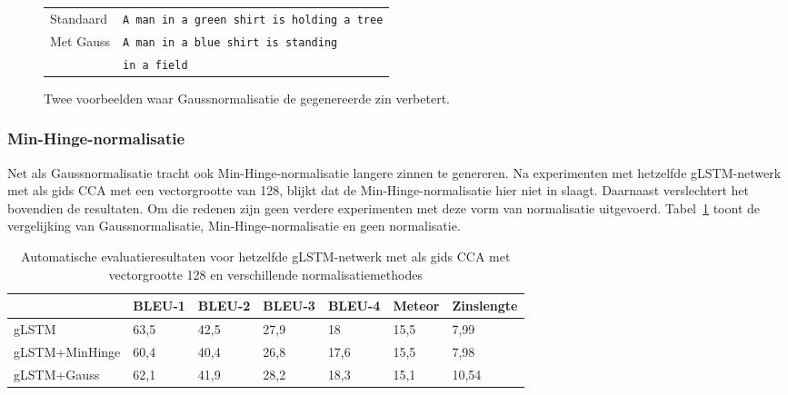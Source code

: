 \begin{figure}
\begin{minipage}[t]{.3\textwidth}
		\end{minipage}\hfill
		\begin{minipage}[t]{.7\textwidth}
			\vspace{0pt}
			\begin{tabular}{ll}
				Standaard & \texttt{A man in a green shirt is holding a tree} \\
				Met Gauss & \texttt{A man in a blue shirt is standing }\\
				~ & \texttt{in a field} \\
			\end{tabular}
		\end{minipage}
\caption{Twee voorbeelden waar Gaussnormalisatie de gegenereerde zin verbetert.}
\label{fig:gauss_improve}
\end{figure}
\subsubsection{Min-Hinge-normalisatie}
Net als Gaussnormalisatie tracht ook Min-Hinge-normalisatie langere zinnen te genereren.
Na experimenten met hetzelfde gLSTM-netwerk met als gids CCA met een vectorgrootte van 128, blijkt dat de Min-Hinge-normalisatie hier niet in slaagt. Daarnaast verslechtert het bovendien de resultaten. Om die redenen zijn geen verdere experimenten met deze vorm van normalisatie uitgevoerd. Tabel~\ref{table:minhinge} toont de vergelijking van Gaussnormalisatie, Min-Hinge-normalisatie en geen normalisatie.

\begin{table}
	\centering
	\begin{tabular}{lllllll}
		~                  & BLEU-1 & BLEU-2 & BLEU-3 & BLEU-4 & Meteor&Zinslengte \\ \hline
		gLSTM        & 63,5   & 42,5 			& 27,9   & 18   & 15,5&7,99  \\
		gLSTM+MinHinge & 60,4   &40,4    &26,8   & 17,6   & 15,5& 7,98 \\
		gLSTM+Gauss   & 62,1   & 41,9   & 28,2   & 18,3 & 15,1& 10,54 \\ \hline
		
	\end{tabular}
	
	\caption{Automatische evaluatieresultaten voor hetzelfde gLSTM-netwerk met als gids CCA met vectorgrootte 128 en verschillende normalisatiemethodes}
	\label{table:minhinge}
\end{table}

